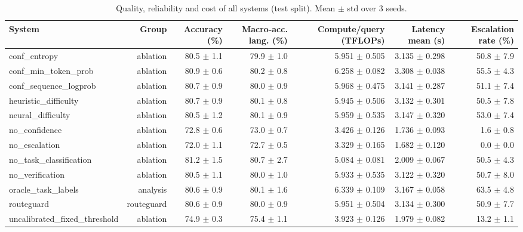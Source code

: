 \begin{table}[t]
\centering
\small
\caption{Quality, reliability and cost of all systems (test split). Mean $\pm$ std over 3 seeds.}
\label{tab:main_results}
\begin{tabular}{lrrrrrr}
\toprule
System & Group & Accuracy (\%) & Macro-acc. lang. (\%) & Compute/query (TFLOPs) & Latency mean (s) & Escalation rate (\%) \\
\midrule
conf\_entropy & ablation & 80.5 $\pm$ 1.1 & 79.9 $\pm$ 1.0 & 5.951 $\pm$ 0.505 & 3.135 $\pm$ 0.298 & 50.8 $\pm$ 7.9 \\
conf\_min\_token\_prob & ablation & 80.9 $\pm$ 0.6 & 80.2 $\pm$ 0.8 & 6.258 $\pm$ 0.082 & 3.308 $\pm$ 0.038 & 55.5 $\pm$ 4.3 \\
conf\_sequence\_logprob & ablation & 80.7 $\pm$ 0.9 & 80.0 $\pm$ 0.9 & 5.968 $\pm$ 0.475 & 3.141 $\pm$ 0.287 & 51.1 $\pm$ 7.4 \\
heuristic\_difficulty & ablation & 80.7 $\pm$ 0.9 & 80.1 $\pm$ 0.8 & 5.945 $\pm$ 0.506 & 3.132 $\pm$ 0.301 & 50.5 $\pm$ 7.8 \\
neural\_difficulty & ablation & 80.5 $\pm$ 1.2 & 80.1 $\pm$ 0.9 & 5.959 $\pm$ 0.535 & 3.147 $\pm$ 0.320 & 53.0 $\pm$ 7.4 \\
no\_confidence & ablation & 72.8 $\pm$ 0.6 & 73.0 $\pm$ 0.7 & 3.426 $\pm$ 0.126 & 1.736 $\pm$ 0.093 & 1.6 $\pm$ 0.8 \\
no\_escalation & ablation & 72.0 $\pm$ 1.1 & 72.7 $\pm$ 0.5 & 3.329 $\pm$ 0.165 & 1.682 $\pm$ 0.120 & 0.0 $\pm$ 0.0 \\
no\_task\_classification & ablation & 81.2 $\pm$ 1.5 & 80.7 $\pm$ 2.7 & 5.084 $\pm$ 0.081 & 2.009 $\pm$ 0.067 & 50.5 $\pm$ 4.3 \\
no\_verification & ablation & 80.5 $\pm$ 1.1 & 80.0 $\pm$ 1.0 & 5.933 $\pm$ 0.535 & 3.122 $\pm$ 0.320 & 50.7 $\pm$ 8.0 \\
oracle\_task\_labels & analysis & 80.6 $\pm$ 0.9 & 80.1 $\pm$ 1.6 & 6.339 $\pm$ 0.109 & 3.167 $\pm$ 0.058 & 63.5 $\pm$ 4.8 \\
routeguard & routeguard & 80.6 $\pm$ 0.9 & 80.0 $\pm$ 0.9 & 5.951 $\pm$ 0.504 & 3.134 $\pm$ 0.300 & 50.9 $\pm$ 7.7 \\
uncalibrated\_fixed\_threshold & ablation & 74.9 $\pm$ 0.3 & 75.4 $\pm$ 1.1 & 3.923 $\pm$ 0.126 & 1.979 $\pm$ 0.082 & 13.2 $\pm$ 1.1 \\
\bottomrule
\end{tabular}
\end{table}
